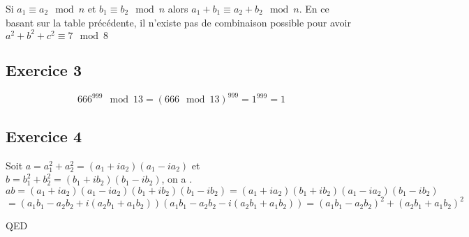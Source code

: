 \documentclass[]{book}
\theoremstyle{definition}
\begin{document}
Si $a_1 \equiv a_2 \mod n$ et $b_1 \equiv b_2 \mod n$ alors $a_1+b_1 \equiv a_2+b_2 \mod n$. En ce basant sur la table pr\'ec\'edente, il n'existe pas de combinaison possible pour avoir $a^2+b^2+c^2 \equiv 7 \mod 8$


\subsection*{Exercice 3}
$$666^999 \mod 13 = (666 \mod 13)^999 = 1^999 = 1$$

\subsection*{Exercice 4}
Soit $a=a_1^2+a_2^2 = (a_1+ia_2)(a_1-ia_2)$ et $b=b_1^2+b_2^2=(b_1+ib_2)(b_1-ib_2)$, on a .
$$ab = (a_1+ia_2)(a_1-ia_2)(b_1+ib_2)(b_1-ib_2) = (a_1+ia_2)(b_1+ib_2)(a_1-ia_2)(b_1-ib_2)$$
$$=(a_1b_1-a_2b_2 + i(a_2b_1+a_1b_2))(a_1b_1-a_2b_2 - i(a_2b_1+a_1b_2)) = (a_1b_1-a_2b_2)^2+(a_2b_1+a_1b_2)^2$$

QED
\end{document}

